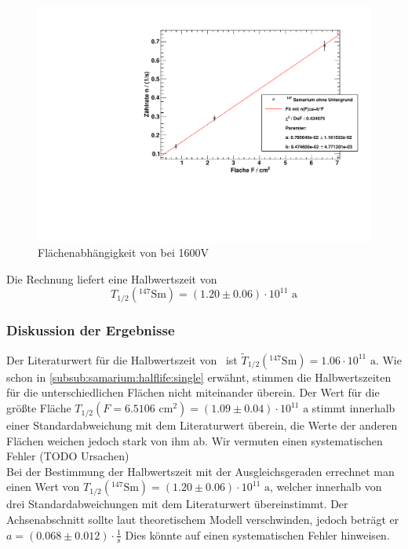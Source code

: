 \begin{figure}[H]
\begin{center}
  \includegraphics[width=15cm]{../img/Samarium147-Flaechenabhaengigkeit.pdf}
  \caption[Flächenabhängigkeit von \samarium]{Flächenabhängigkeit von \samarium bei 1600V}
  \label{img:samarium:areafit}
\end{center}
\end{figure}
Die Rechnung liefert eine Halbwertszeit von
\begin{equation}
  T_{1/2}({}^{147}\text{Sm}) = (1.20 \pm 0.06) \cdot 10^{11} \text{ a}
\end{equation}

\subsubsection{Diskussion der Ergebnisse}
Der Literaturwert für die Halbwertszeit von \samarium\, ist $\tilde{T}_{1/2}({}^{147}\text{Sm}) = 1.06 \cdot 10^{11} \text{ a}$.
Wie schon in \ref{subsub:samarium:halflife:single} erwähnt, stimmen die Halbwertszeiten für die unterschiedlichen Flächen nicht miteinander 
überein. Der Wert für die größte Fläche $T_{1/2}(F=6.5106 \text{ cm}^2) = (1.09 \pm 0.04)\cdot 10^{11} \text{ a}$ stimmt innerhalb einer 
Standardabweichung mit dem Literaturwert überein, die Werte der anderen Flächen weichen jedoch stark von ihm ab. Wir vermuten einen systematischen 
Fehler (TODO Ursachen) \\%
Bei der Bestimmung der Halbwertszeit mit der Ausgleichsgeraden errechnet man einen Wert von 
$T_{1/2}({}^{147}\text{Sm}) = (1.20 \pm 0.06) \cdot 10^{11} \text{ a}$, welcher innerhalb von drei Standardabweichungen mit dem Literaturwert 
übereinstimmt. Der Achsenabschnitt sollte laut theoretischem Modell verschwinden, jedoch beträgt er $a = (0.068  \pm 0.012 ) \cdot \frac{1}{\text{s}}$
Dies könnte auf einen systematischen Fehler hinweisen.


